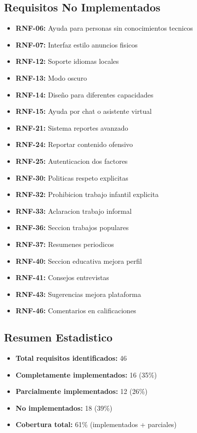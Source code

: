 \documentclass[12pt, a4paper]{article}
\begin{document}
\begin{itemize}
\subsection{Requisitos No Implementados}
\begin{itemize}
    \item \textbf{RNF-06:} Ayuda para personas sin conocimientos tecnicos
    \item \textbf{RNF-07:} Interfaz estilo anuncios fisicos
    \item \textbf{RNF-12:} Soporte idiomas locales
    \item \textbf{RNF-13:} Modo oscuro
    \item \textbf{RNF-14:} Diseño para diferentes capacidades
    \item \textbf{RNF-15:} Ayuda por chat o asistente virtual
    \item \textbf{RNF-21:} Sistema reportes avanzado
    \item \textbf{RNF-24:} Reportar contenido ofensivo
    \item \textbf{RNF-25:} Autenticacion dos factores
    \item \textbf{RNF-30:} Politicas respeto explicitas
    \item \textbf{RNF-32:} Prohibicion trabajo infantil explicita
    \item \textbf{RNF-33:} Aclaracion trabajo informal
    \item \textbf{RNF-36:} Seccion trabajos populares
    \item \textbf{RNF-37:} Resumenes periodicos
    \item \textbf{RNF-40:} Seccion educativa mejora perfil
    \item \textbf{RNF-41:} Consejos entrevistas
    \item \textbf{RNF-43:} Sugerencias mejora plataforma
    \item \textbf{RNF-46:} Comentarios en calificaciones
\end{itemize}

\subsection{Resumen Estadistico}
\begin{itemize}
    \item \textbf{Total requisitos identificados:} 46
    \item \textbf{Completamente implementados:} 16 (35\%)
    \item \textbf{Parcialmente implementados:} 12 (26\%)
    \item \textbf{No implementados:} 18 (39\%)
    \item \textbf{Cobertura total:} 61\% (implementados + parciales)
\end{itemize}


\end{itemize}
\end{document}
